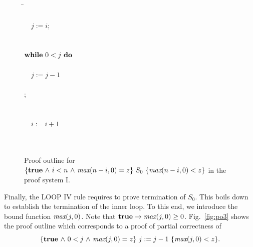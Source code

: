 \documentclass[manuscript, screen, review]{acmart}
\begin{document}
 \begin{figure}[ht]
 \begin{tabbing}
 \qquad\qquad                                       
\=   \\
\>                           \\
\>  \ \ $j:=i; $                                \\
\>                            \\
\>             \\
\>  $\mbox{$\mbox{{\bf while}\ } {0 < j}\ \mbox{{\bf do}\ }$}$                          \\
\>  \qquad {}                  \\
\>  \qquad \ \ $j:=j-1$                         \\
\> \qquad {}                    \\
\>  \OD ;                                       \\
\>            \\
\>                       \\
\>  \ \ $i:=i+1$                                \\
\>                            \\
\>                \\
[\bigskipamount]
\end{tabbing}
\caption{Proof outline for $\mbox{$\{{\mbox{{\bf true}}\mbox{$\ \wedge\ $} i < n \mbox{$\ \wedge\ $} \mbox{\it max}(n-i,0) = z}\}\ {S_0}\ \{{\mbox{\it max}(n-i,0) < z}\}$}$  in the proof system I.}
\label{fig:po2}

\end{figure}

Finally, the LOOP IV rule requires to prove termination of $S_0$.
This boils down to establish the termination of the inner loop.
To this end, we introduce
the bound function $\mbox{\it max}(j,0)$.
Note that $\mbox{{\bf true}}\to \mbox{\it max}(j,0)\geq 0$. 
Fig.~\ref{fig:po3} shows the proof outline
which corresponds to a proof of  partial correctness of
$$\mbox{$\{{\mbox{{\bf true}}\mbox{$\ \wedge\ $} 0<j\mbox{$\ \wedge\ $}  \mbox{\it max}(j,0)= z}\}\ {j:=j-1}\ \{{\mbox{\it max}(j,0) < z}\}$}.$$
\end{document}
